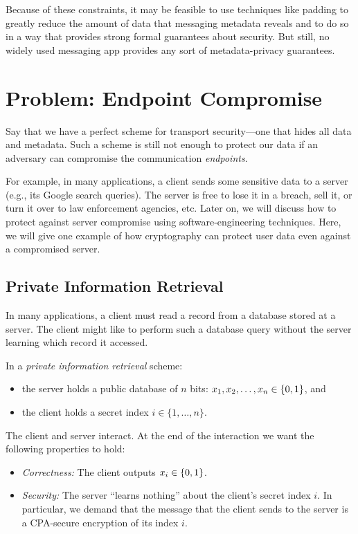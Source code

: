 Because of these constraints, it may be feasible to
use techniques like padding to greatly reduce the
amount of data that messaging metadata reveals and
to do so in a way that provides strong formal
guarantees about security.
But still, no widely used messaging app provides
any sort of metadata-privacy guarantees.

\section{Problem: Endpoint Compromise}

Say that we have a perfect scheme for transport security---one
that hides all data and metadata.
Such a scheme is still not enough to protect our data if
an adversary can compromise the communication \emph{endpoints}.

For example, in many applications, a client sends 
some sensitive data to a server (e.g., its Google search queries).
The server is free to lose it in
a breach, sell it, or turn it over to law
enforcement agencies, etc. 
Later on, we will discuss how to protect against server compromise
using software-engineering techniques.
Here, we will give one example of how cryptography can protect user
data even against a compromised server.

\subsection{Private Information Retrieval}
In many applications, a client must read a record from a
database stored at a server.
The client might like to perform such a database query
without the server
learning which record it accessed.

In a \emph{private information retrieval} scheme:
\begin{itemize}[noitemsep]
  \item the server holds a 
    public database of $n$ bits: $x_1, x_2, \ldots, x_n \in \{0,1\}$, and
  \item the client holds a secret index $i \in \{1, \dots, n\}$.
\end{itemize}
The client and server interact. At the end of the interaction
we want the following properties to hold:
\begin{itemize}[noitemsep]
  \item \emph{Correctness:} The client outputs $x_i \in \{0,1\}$.
  \item \emph{Security:} The server ``learns nothing'' about the
    client's secret index $i$. In particular, we demand that the
    message that the client sends to the server is a CPA-secure
    encryption of its index $i$.
\end{itemize}

